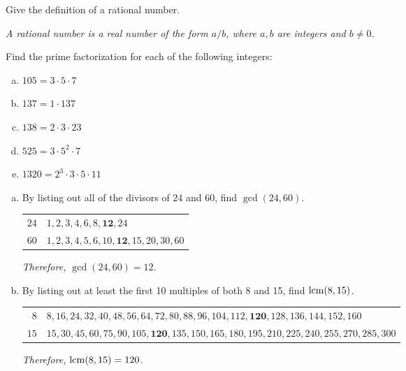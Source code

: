 \documentclass[11pt,letterpaper]{article}
\begin{document}

 Give the definition of a rational number. \pvspace{1cm}

{\itshape A rational number is a real number of the form $a/b$, where $a, b$ are integers and $b \neq 0$.} \pvspace{1cm}






 Find the prime factorization for each of the following integers: \pspace
\begin{enumerate}[(a)]
\item $105= 3 \cdot 5 \cdot 7$ \vfill
\item $137= 1 \cdot 137$ \vfill
\item $138= 2 \cdot 3 \cdot 23$ \vfill
\item $525= 3 \cdot 5^2 \cdot 7$ \vfill
\item $1320= 2^3 \cdot 3 \cdot 5 \cdot 11$ \vfill
\end{enumerate}



\newpage



\begin{enumerate}[(a)]
\item By listing out all of the divisors of $24$ and $60$, find $\gcd(24, 60)$. \pspace
	\begin{table}[!ht]
	\centering
	\begin{tabular}{r|l}
	$24$ & $1, 2, 3, 4, 6, 8, \mathbf{12}, 24$ \\
	$60$ & $1, 2, 3, 4, 5, 6, 10, \mathbf{12}, 15, 20, 30, 60$
	\end{tabular}
	\end{table}
{\itshape Therefore, $\gcd(24, 60)= 12$.} \pvspace{2.2cm}


\item By listing out at least the first 10 multiples of both 8 and 15, find $\operatorname{lcm}(8, 15)$. \pspace
	\begin{table}[!ht]
	\centering
	\begin{tabular}{r|l}
	$8$ & $8, 16, 24, 32, 40, 48, 56, 64, 72, 80, 88, 96, 104, 112, \mathbf{120}, 128, 136, 144, 152, 160$ \\
	$15$ & $15, 30, 45, 60, 75, 90, 105, \mathbf{120}, 135, 150, 165, 180, 195, 210, 225, 240, 255, 270, 285, 300$
	\end{tabular}
	\end{table}
{\itshape Therefore, $\operatorname{lcm}(8, 15)= 120$.}
\end{enumerate} \vspace{2.3cm}
\end{document}
